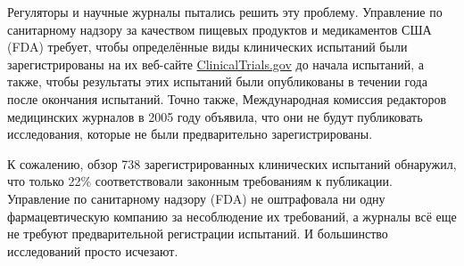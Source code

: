 Регуляторы и научные журналы пытались решить эту проблему. Управление по санитарному надзору за качеством пищевых продуктов и медикаментов США (FDA) требует, чтобы определённые виды клинических испытаний были зарегистрированы на их веб-сайте \href{https://clinicaltrials.gov/}{ClinicalTrials.gov} до начала испытаний, а также, чтобы результаты этих испытаний были опубликованы в течении года после окончания испытаний. Точно также, Международная комиссия редакторов медицинских журналов в 2005 году объявила, что они не будут публиковать исследования, которые не были предварительно зарегистрированы.

К сожалению, обзор 738 зарегистрированных клинических испытаний обнаружил, что только 22\% соответствовали законным требованиям к публикации.\cite{prayle_compliance_2012} Управление по санитарному надзору (FDA) не оштрафовала ни одну фармацевтическую компанию за несоблюдение их требований, а журналы всё еще не требуют предварительной регистрации испытаний. И большинство исследований просто исчезают.
